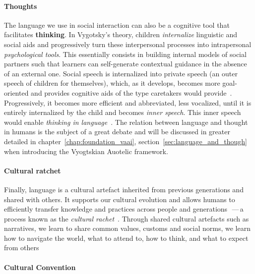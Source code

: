 \paragraph{Thoughts}

The language we use in social interaction can also be a cognitive tool that facilitates \textbf{thinking}. In Vygotsky's theory, children \textit{internalize} linguistic and social aids and progressively turn these interpersonal processes into intrapersonal \textit{psychological tools}. This essentially consists in building internal models of social partners such that learners can self-generate contextual guidance in the absence of an external one. Social speech is internalized into private speech (an outer speech of children for themselves), which, as it develops, becomes more goal-oriented and provides cognitive aids of the type caretakers would provide~\citep{vygotsky_thought_1934,berk_why_1994}. Progressively, it becomes more efficient and abbreviated, less vocalized, until it is entirely internalized by the child and becomes \textit{inner speech}. This inner speech would enable \textit{thinking in language}~\citep{carruthers1998thinking}. The relation between language and thought in humans is the subject of a great debate and will be discussed in greater detailed in chapter~\ref{chap:foundation_vaai}, section~\ref{sec:language_and_though} when introducing the Vyogtskian Auotelic \ai framework.

\paragraph{Cultural ratchet}

Finally, language is a cultural artefact inherited from previous generations and shared with others. It supports our cultural evolution and allows humans to efficiently transfer knowledge and practices across people and generations~\citep{henrich2003evolution,morgan_experimental_2015,chopra2019first}\,---\,a process known as the \textit{cultural rachet}~\citep{tomasello_cultural_1999}. Through shared cultural artefacts such as narratives, we learn to share common values, customs and social norms, we learn how to navigate the world, what to attend to, how to think, and what to expect from others~\citep{bruner1990acts} 

\paragraph{Cultural Convention}

